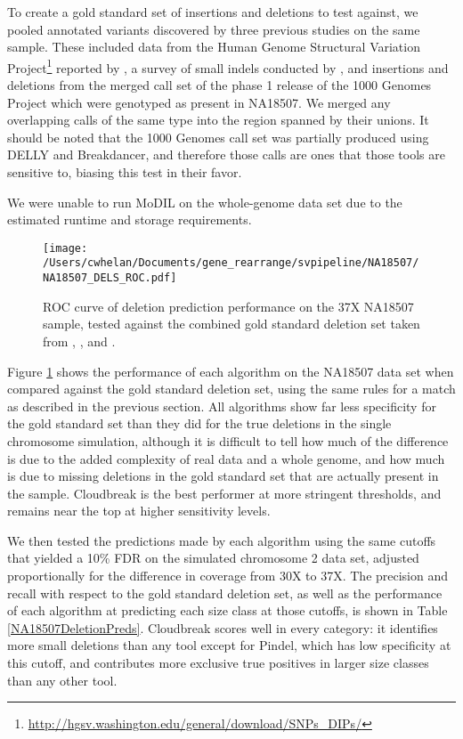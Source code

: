 \documentclass[11pt]{article}
\begin{document}
To create a gold standard set of insertions and deletions to test against, we pooled annotated variants discovered by three previous studies on the same sample. These included data from the Human Genome Structural Variation Project\footnote{\url{http://hgsv.washington.edu/general/download/SNPs_DIPs/}} reported by \textcite{Kidd:2008p926}, a survey of small indels conducted by \textcite{Mills:2011fi}, and insertions and deletions from the merged call set of the phase 1 release of the 1000 Genomes Project \autocite{GenomesProjectConsortium:2012co} which were genotyped as present in NA18507. We merged any overlapping calls of the same type into the region spanned by their unions. It should be noted that the 1000 Genomes call set was partially produced using DELLY and Breakdancer, and therefore those calls are ones that those tools are sensitive to, biasing this test in their favor.

We were unable to run MoDIL on the whole-genome data set due to the estimated runtime and storage requirements.

\begin{figure}[t]
\centering
\texttt{[image: /Users/cwhelan/Documents/gene\_rearrange/svpipeline/NA18507/NA18507\_DELS\_ROC.pdf]}
\caption{ROC curve of deletion prediction performance on the 37X NA18507 sample, tested against the combined gold standard deletion set taken from \textcite{Kidd:2008p926}, \textcite{Mills:2011fi}, and \textcite{GenomesProjectConsortium:2012co}.}
\label{NA18507DeletionsRoc}
\end{figure}

Figure \ref{NA18507DeletionsRoc} shows the performance of each algorithm on the NA18507 data set when compared against the gold standard deletion set, using the same rules for a match as described in the previous section. All algorithms show far less specificity for the gold standard set than they did for the true deletions in the single chromosome simulation, although it is difficult to tell how much of the difference is due to the added complexity of real data and a whole genome, and how much is due to missing deletions in the gold standard set that are actually present in the sample. Cloudbreak is the best performer at more stringent thresholds, and remains near the top at higher sensitivity levels.

We then tested the predictions made by each algorithm using the same cutoffs that yielded a 10\% FDR on the simulated chromosome 2 data set, adjusted proportionally for the difference in coverage from 30X to 37X. The precision and recall with respect to the gold standard deletion set, as well as the performance of each algorithm at predicting each size class at those cutoffs, is shown in Table \ref{NA18507DeletionPreds}. Cloudbreak scores well in every category: it identifies more small deletions than any tool except for Pindel, which has low specificity at this cutoff, and contributes more exclusive true positives in larger size classes than any other tool.
\end{document}
